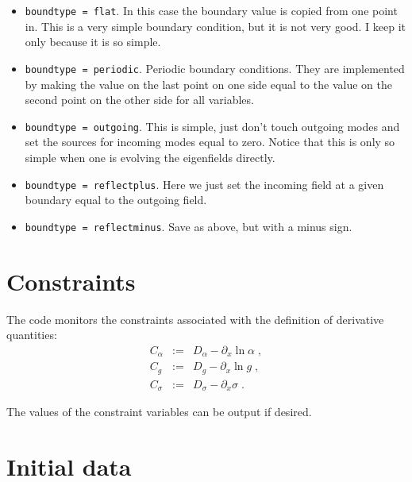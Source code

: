 \documentclass[12pt]{article}
\begin{document}
\begin{itemize}

\item \texttt{boundtype = flat}. In this case the boundary value is
copied from one point in.  This is a very simple boundary condition,
but it is not very good.  I keep it only because it is so simple.

\item \texttt{boundtype = periodic}.  Periodic boundary conditions.
They are implemented by making the value on the last point on one side
equal to the value on the second point on the other side for all
variables.

\item \texttt{boundtype = outgoing}.  This is simple, just don't touch
outgoing modes and set the sources for incoming modes equal to zero.
Notice that this is only so simple when one is evolving the
eigenfields directly.

\item \texttt{boundtype = reflectplus}.  Here we just set the incoming
field at a given boundary equal to the outgoing field.

\item \texttt{boundtype = reflectminus}.  Save as above, but with a
minus sign.

\end{itemize}



\setcounter{equation}{0}
\section{Constraints}
\label{sec:constraints}

The code monitors the constraints associated with the definition of
derivative quantities:
\begin{eqnarray}
C_\alpha  &:=&  D_\alpha  -  \partial_x \ln{\alpha} \; , \\
C_g  &:=&  D_g  -  \partial_x \ln{g} \; , \\
C_\sigma &:=& D_\sigma - \partial_x \sigma \; .
\end{eqnarray}

The values of the constraint variables can be output if desired.



\setcounter{equation}{0}
\section{Initial data}
\label{sec:initial}
\end{document}
